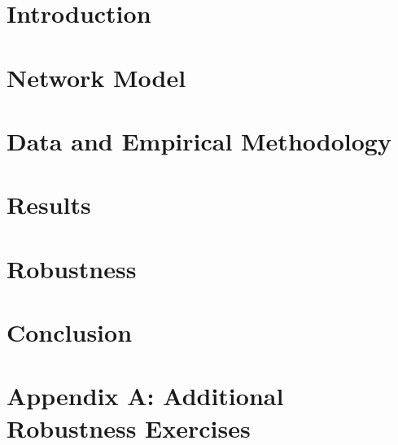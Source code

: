 \documentclass[12pt]{article}
\begin{document}
\section{Introduction}
\label{sec:intro}



\section{Network Model}

\label{sec:model}



\section{Data and Empirical Methodology}
\label{sec:data}



\section{Results}
\label{sec:results}



\section{Robustness}
\label{sec:robustness}



\section{Conclusion}



\bigskip \bigskip \bigskip \singlespacing 
\vspace{-.3in} {\footnotesize 


}

\section{Appendix A: Additional Robustness Exercises} \label{sec:appendixa}

\end{document}
